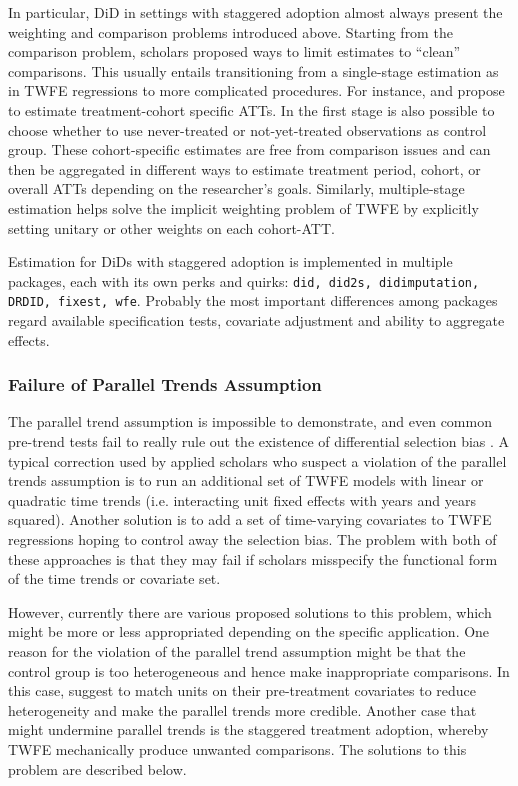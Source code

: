 \documentclass[hidelinks]{article}\usepackage[]{graphicx}\usepackage[]{xcolor}
\begin{document}
In particular, DiD in settings with staggered adoption almost always present the weighting and comparison problems introduced above.
Starting from the comparison problem, scholars proposed ways to limit estimates to ``clean'' comparisons. This usually entails transitioning from a single-stage estimation as in TWFE regressions to more complicated procedures. For instance, \textcite{Gardner} and \textcite{Callaway2021} propose to estimate treatment-cohort specific ATTs. In the first stage is also possible to choose whether to use never-treated or not-yet-treated observations as control group.
These cohort-specific estimates are free from comparison issues and can then be aggregated in different ways to estimate treatment period, cohort, or overall ATTs depending on the researcher's goals. 
Similarly, multiple-stage estimation helps solve the implicit weighting problem of TWFE by explicitly setting unitary or other weights on each cohort-ATT.

Estimation for DiDs with staggered adoption is implemented in multiple packages, each with its own perks and quirks: \texttt{did, did2s, didimputation, DRDID, fixest, wfe}. Probably the most important differences among packages regard available specification tests, covariate adjustment and ability to aggregate effects.


\subsubsection{Failure of Parallel Trends Assumption}

The parallel trend assumption is impossible to demonstrate, and even common pre-trend tests fail to really rule out the existence of differential selection bias \parencite{Roth2022}. A typical correction used by applied scholars who suspect a violation of the parallel trends assumption is to run an additional set of TWFE models with linear or quadratic time trends (i.e. interacting unit fixed effects with years and years squared). Another solution is to add a set of time-varying covariates to TWFE regressions hoping to control away the selection bias. The problem with both of these approaches is that they may fail if scholars misspecify the functional form of the time trends or covariate set.

However, currently there are various proposed solutions to this problem, which might be more or less appropriated depending on the specific application. 
One reason for the violation of the parallel trend assumption might be that the control group is too heterogeneous and hence make inappropriate comparisons. In this case, \textcite{Abadie2005,Imai2021} suggest to match units on their pre-treatment covariates to reduce heterogeneity and make the parallel trends more credible.
Another case that might undermine parallel trends is the staggered treatment adoption, whereby TWFE mechanically produce unwanted comparisons. The solutions to this problem are described below.
\end{document}
